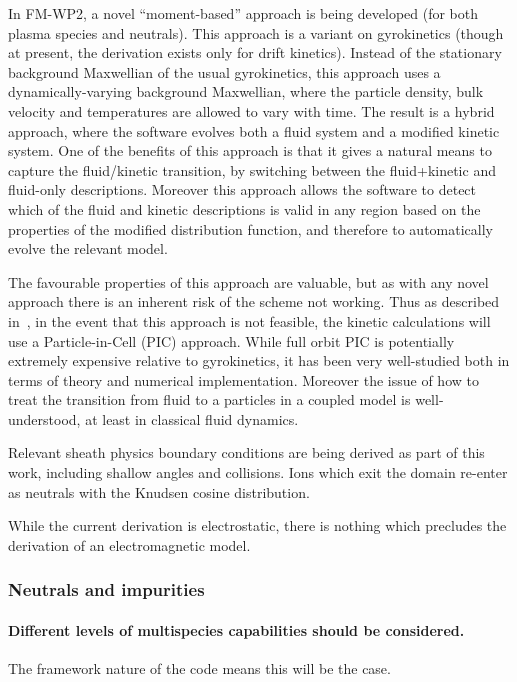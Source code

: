 In FM-WP2, a novel ``moment-based'' approach is being developed (for both
plasma species and neutrals).
This approach is a variant on gyrokinetics (though at present, the derivation
exists only for drift kinetics).
Instead of the stationary background Maxwellian of the usual gyrokinetics, this
approach uses a dynamically-varying background Maxwellian, where the
particle density, bulk velocity and temperatures are allowed to vary with time.
The result is a hybrid approach, where the software evolves both a fluid system
and a modified kinetic system.
One of the benefits of this approach is that it gives a natural means to
capture the fluid/kinetic transition, by switching between the fluid+kinetic
and fluid-only descriptions.
Moreover this approach allows the software to detect which of the fluid and kinetic
descriptions is valid in any region based on the properties of the modified
distribution function, and therefore to automatically evolve the relevant
model.

The favourable properties of this approach are valuable,
but as with any novel approach there is an inherent risk of the scheme not
working.  Thus as described in~\cite[\S\,1.1]{pappeqs2}, in the event that
this approach is not feasible, the kinetic calculations
will use a Particle-in-Cell (PIC) approach.
While full orbit PIC is potentially extremely expensive relative to gyrokinetics,
it has been very well-studied both in terms of theory and numerical implementation.
Moreover the issue of how to treat the transition from fluid to a particles in
a coupled model is well-understood, at least in classical fluid dynamics.

Relevant sheath physics boundary conditions are being derived as part of this
work, including shallow angles and collisions.
Ions which exit the domain re-enter as neutrals with the Knudsen cosine
distribution.

While the current derivation is electrostatic, there is nothing which precludes
the derivation of an electromagnetic model.


\subsubsection{Neutrals and impurities}

\paragraph{Different levels of multispecies capabilities should be considered.}
The framework nature of the code means this will be the case.

